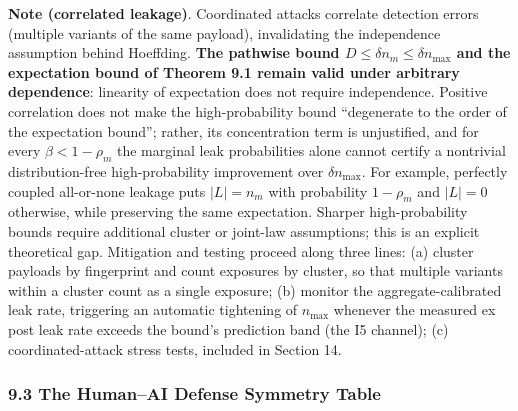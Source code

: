 \documentclass[
  11pt]{article}
\begin{document}
\textbf{Note (correlated leakage)}. Coordinated attacks correlate
detection errors (multiple variants of the same payload), invalidating
the independence assumption behind Hoeffding. \textbf{The pathwise bound
\(D\le\delta n_m\le\delta n_{\max}\) and the expectation bound of
Theorem 9.1 remain valid under arbitrary dependence}: linearity of
expectation does not require independence. Positive correlation does not
make the high-probability bound ``degenerate to the order of the
expectation bound''; rather, its concentration term is unjustified, and
for every \(\beta<1-\rho_m\) the marginal leak probabilities alone
cannot certify a nontrivial distribution-free high-probability
improvement over \(\delta n_{\max}\). For example, perfectly coupled
all-or-none leakage puts \(|L|=n_m\) with probability \(1-\rho_m\) and
\(|L|=0\) otherwise, while preserving the same expectation. Sharper
high-probability bounds require additional cluster or joint-law
assumptions; this is an explicit theoretical gap. Mitigation and testing
proceed along three lines: (a) cluster payloads by fingerprint and count
exposures by cluster, so that multiple variants within a cluster count
as a single exposure; (b) monitor the aggregate-calibrated leak rate,
triggering an automatic tightening of \(n_{\max}\) whenever the measured
ex post leak rate exceeds the bound's prediction band (the I5 channel);
(c) coordinated-attack stress tests, included in Section 14.

\subsubsection{9.3 The Human--AI Defense Symmetry
Table}\label{the-humanai-defense-symmetry-table}
\end{document}
